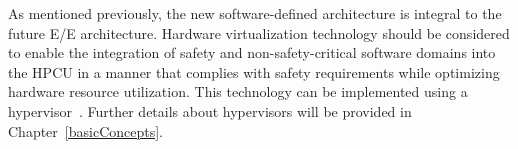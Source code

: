     As mentioned previously, the new software-defined architecture is integral to the future E/E architecture. Hardware virtualization technology should be considered to enable the integration of safety and non-safety-critical software domains into the HPCU in a manner that complies with safety requirements while optimizing hardware resource utilization. This technology can be implemented using a hypervisor~\cite{askaripoor2022architecture,9968908}. Further details about hypervisors will be provided in Chapter~\ref{basicConcepts}.


